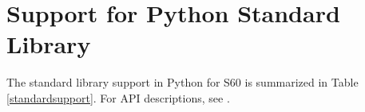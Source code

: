 %
%
%

\section{Support for Python Standard Library}
\label{sec:standard}

The standard library support in Python for S60 is summarized in Table 
\ref{standardsupport}. For API descriptions, see \cite{PyLibRef}.

